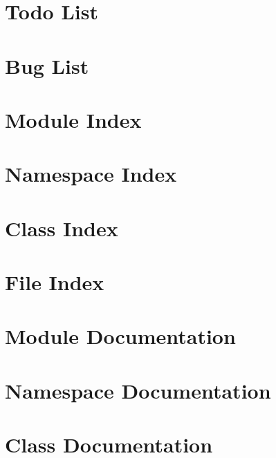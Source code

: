 \documentclass[twoside]{book}
\begin{document}
\chapter{Todo List}
\label{todo}
\hypertarget{todo}{}

\chapter{Bug List}
\label{bug}
\hypertarget{bug}{}

\chapter{Module Index}

\chapter{Namespace Index}

\chapter{Class Index}

\chapter{File Index}

\chapter{Module Documentation}







\chapter{Namespace Documentation}

\chapter{Class Documentation}












\end{document}
